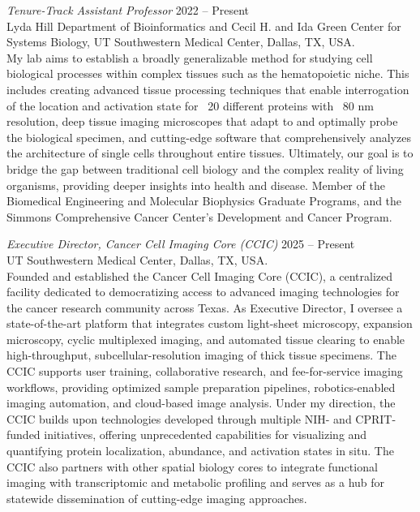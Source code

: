 {\sl Tenure-Track Assistant Professor} \hfill 2022 -- Present \\ 
Lyda Hill Department of Bioinformatics and Cecil H. and Ida Green Center for Systems Biology, UT Southwestern Medical Center, Dallas, TX, USA. \hfill \\
\forceindent My lab aims to establish a broadly generalizable method for studying cell biological processes within complex tissues such as the hematopoietic niche. This includes creating advanced tissue processing techniques that enable interrogation of the location and activation state for ~20 different proteins with ~80 nm resolution, deep tissue imaging microscopes that adapt to and optimally probe the biological specimen, and cutting-edge software that comprehensively analyzes the architecture of single cells throughout entire tissues. Ultimately, our goal is to bridge the gap between traditional cell biology and the complex reality of living organisms, providing deeper insights into health and disease. Member of the Biomedical Engineering and Molecular Biophysics Graduate Programs, and the Simmons Comprehensive Cancer Center's Development and Cancer Program.

{\sl Executive Director, Cancer Cell Imaging Core (CCIC)} \hfill 2025 -- Present \\ 
UT Southwestern Medical Center, Dallas, TX, USA. \hfill \\
\forceindent Founded and established the Cancer Cell Imaging Core (CCIC), a centralized facility dedicated to democratizing access to advanced imaging technologies for the cancer research community across Texas. As Executive Director, I oversee a state-of-the-art platform that integrates custom light-sheet microscopy, expansion microscopy, cyclic multiplexed imaging, and automated tissue clearing to enable high-throughput, subcellular-resolution imaging of thick tissue specimens. The CCIC supports user training, collaborative research, and fee-for-service imaging workflows, providing optimized sample preparation pipelines, robotics-enabled imaging automation, and cloud-based image analysis. Under my direction, the CCIC builds upon technologies developed through multiple NIH- and CPRIT-funded initiatives, offering unprecedented capabilities for visualizing and quantifying protein localization, abundance, and activation states in situ. The CCIC also partners with other spatial biology cores to integrate functional imaging with transcriptomic and metabolic profiling and serves as a hub for statewide dissemination of cutting-edge imaging approaches.

